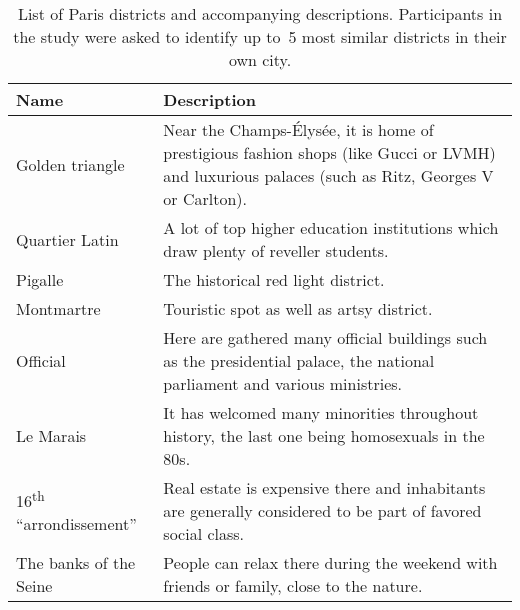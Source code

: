 \begin{table}[ht]
	\centering
	\begin{tabularx}{\textwidth}{lX}
		\toprule
		Name & Description \\
		\midrule
		Golden triangle & Near the Champs-Élysée, it is home of prestigious fashion shops (like Gucci or LVMH) and luxurious palaces (such as Ritz, Georges V or Carlton). \\
		Quartier Latin & A lot of top higher education institutions which draw plenty of reveller students. \\
		Pigalle & The historical red light district. \\
		Montmartre & Touristic spot as well as artsy district. \\
		Official & Here are gathered many official buildings such as the presidential palace, the national parliament and various ministries. \\
		Le Marais & It has welcomed many minorities throughout history, the last one being homosexuals in the 80s. \\
		16\textsuperscript{th} \enquote{arrondissement} & Real estate is expensive there and inhabitants are generally considered to be part of favored social class. \\
		The banks of the Seine & People can relax there during the weekend with friends or family, close to the nature. \\
		\bottomrule
	\end{tabularx}
	\caption[Ground truth neighborhoods]{List of Paris districts and accompanying
		descriptions. Participants in the study were asked to identify up to~5 most
	similar districts in their own city.\label{tab:district}}
\end{table}
